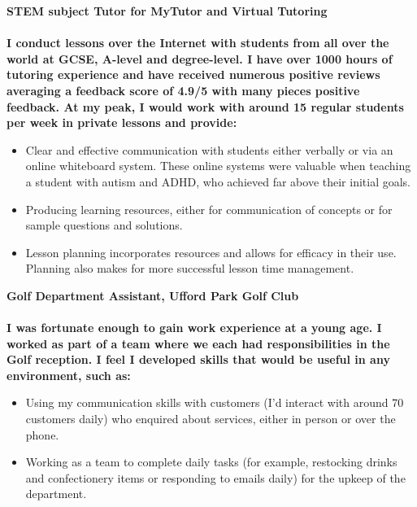 \documentclass[9pt]{article}
\begin{document}
 \hspace{119pt} \bfseries{STEM subject Tutor for MyTutor and Virtual Tutoring} \hspace{160pt} \\
\vspace{0cm}\\
I conduct lessons over the Internet with students from all over the world at GCSE, A-level and degree-level. I have over 1000 hours of tutoring experience and have received numerous positive reviews averaging a feedback score of 4.9/5 with many pieces positive feedback. At my peak, I would work with around 15 regular students per week in private lessons and provide:\\
\begin{itemize}[itemsep=0mm, parsep=0pt]
\item Clear and effective communication with students either verbally or via an online whiteboard system. These online systems were valuable when teaching a student with autism and ADHD, who achieved far above their initial goals.
\item Producing learning resources, either for communication of concepts or for sample questions and solutions. 
\item Lesson planning incorporates resources and allows for efficacy in their use. Planning also makes for more successful lesson time management.
\end{itemize}
 \hspace{80pt} \bfseries{Golf Department Assistant, Ufford Park Golf Club} \hspace{70pt} \\
\vspace{0cm}\\
I was fortunate enough to gain work experience at a young age. I worked as part of a team where we each had responsibilities in the Golf reception. I feel I developed skills that would be useful in any environment, such as:
\begin{itemize}[itemsep=0mm, parsep=0pt]
\item Using my communication skills with customers (I’d interact with around 70 customers daily) who enquired about services, either in person or over the phone. 
\item Working as a team to complete daily tasks (for example, restocking drinks and confectionery items or responding to emails daily) for the upkeep of the department.
\end{itemize}
\end{document}
